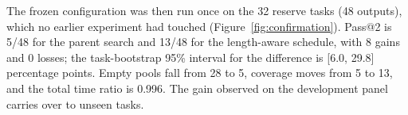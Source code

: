 The frozen configuration was then run once on the 32 reserve tasks (48 outputs), which no earlier experiment had touched (Figure~\ref{fig:confirmation}). Pass@2 is 5/48 for the parent search and 13/48 for the length-aware schedule, with 8 gains and 0 losses; the task-bootstrap 95\% interval for the difference is [6.0, 29.8] percentage points. Empty pools fall from 28 to 5, coverage moves from 5 to 13, and the total time ratio is 0.996. The gain observed on the development panel carries over to unseen tasks.
